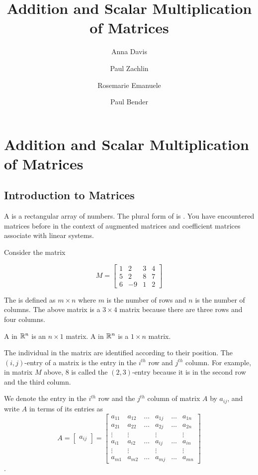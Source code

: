 \documentclass{ximera}
\author{Anna Davis \and Paul Zachlin \and Rosemarie Emanuele \and Paul Bender} \title{Addition and Scalar Multiplication of Matrices} \license{CC-BY 4.0}
\begin{document}
\begin{abstract}
\end{abstract}
\maketitle

\section*{Addition and Scalar Multiplication of Matrices}

\subsection*{Introduction to Matrices}

A  is a rectangular array of numbers. The plural form of  is . You have encountered matrices before in the context of augmented matrices and coefficient matrices associate with linear systems.

Consider the matrix

$$M=\begin{bmatrix}
1 & 2 & 3 & 4 \\
5 & 2 & 8 & 7 \\
6 & -9 & 1 & 2
\end{bmatrix}$$

The  is defined as $m\times n$ where $m$ is the
number of rows and $n$ is the number of columns. The above matrix is a 
$3\times 4$ matrix because there are three rows and four columns.  

A  in $\mathbb{R}^n$ is an $n\times 1$ matrix.  A  in $\mathbb{R}^n$ is a $1\times n$ matrix.  

The individual  in the matrix are identified according to their position. The $( i, j)$-entry of a matrix is the entry 
in the $i^{th}$ row and $j^{th}$ column. For example, in matrix $M$ above,  $8$ is called the $(2,3)$-entry because it is in the second row and the third column. 

We denote the entry in the $i^{th}$ row  and the $j^{th}$ column of matrix $A$ by $a_{ij}$, and write $A$ in terms of its entries
as $$A= \begin{bmatrix} a_{ij} \end{bmatrix}=\begin{bmatrix}
           a_{11} & a_{12}&\dots&a_{1j}&\dots&a_{1n}\\
           a_{21}&a_{22} &\dots&a_{2j}&\dots &a_{2n}\\
		\vdots & \vdots&&\vdots&&\vdots\\
        a_{i1}&a_{i2}&\dots &a_{ij}&\dots &a_{in}\\
        \vdots & \vdots&&\vdots&&\vdots\\
		a_{m1}&a_{m2}&\dots &a_{mj}&\dots &a_{mn}
         \end{bmatrix}$$. 
\end{document}
